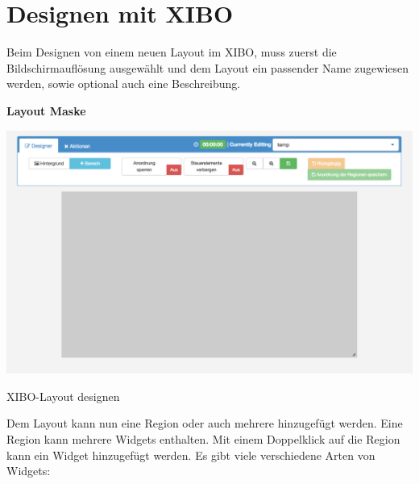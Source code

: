 \section{Designen mit XIBO}\label{sec:designexibo}
Beim Designen von einem neuen Layout im XIBO, muss zuerst die Bildschirmauflösung ausgewählt und dem Layout ein passender Name zugewiesen werden, sowie optional auch eine Beschreibung. 

\textbf{Layout Maske}

\begin{calendar}
	\centering
\includegraphics[width=1\textwidth]{images/xibo-basics-designer}
	\label{img:designeLayout}
	\caption{XIBO-Layout designen}
\end{calendar}	

Dem Layout kann nun eine Region oder auch mehrere  hinzugefügt werden. Eine Region kann mehrere Widgets enthalten. Mit einem Doppelklick auf die Region kann ein Widget hinzugefügt werden. Es gibt viele verschiedene Arten von Widgets:

